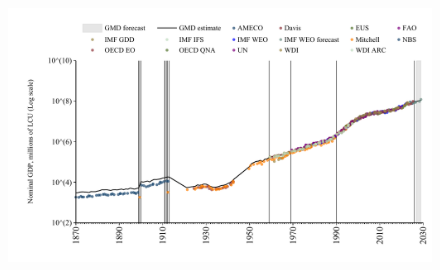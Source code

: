 \documentclass[12pt,a4paper,landscape]{article}
\begin{document}
\begin{adjustbox}{max totalsize={\paperwidth}{\paperheight},center}
\begin{minipage}[t][\textheight][t]{\textwidth}
\begin{figure}[H]
\includegraphics[width=\textwidth,height=0.6\textheight,keepaspectratio]{graphs/HUN_nGDP.pdf}
\end{figure}
\end{minipage}
\end{adjustbox}
\end{document}
